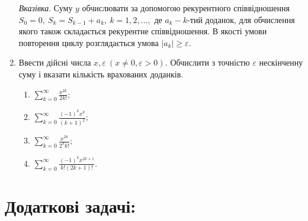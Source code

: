 \documentclass[a5paper,titlepage,openany,twoside,draft]{book_unv}%
\makeatletter
\newcommand{\xslalph}[1]{\expandafter\@xslalph\csname c@#1\endcsname}
\newcommand{\@xslalph}[1]{%
    \ifcase#1\or а\or б\or в\or г\or д\or e\or є\or ж\or з\or i%
    \or й\or к\or л\or м\or н\or о\or п\or р\or с\or т%
    \or у\or ф\or х\or ц\or ч\or ш\or ю\or я\or аа\or бб\or вв%
    \else\@ctrerr\fi%
}
\makeatother
\begin{document}
\begin{enumerate}
\begin{enumerate}[label=\xslalph*)]
\end{enumerate}

\emph{\emph{Вказівка}}. Суму $y$ обчислювати за допомогою
рекурентного співвідношення
\(S_{0} = 0,\ S_{k} = S_{k - 1} + a_{k},\ k = 1,2,\ldots,\) де
\(a_{k} - k\)-тий доданок, для обчислення якого також складається
рекурентне співвідношення. В якості умови повторення циклу розглядається
умова \(\left| a_{k} \right| \geq \varepsilon.\)

\item
  Ввести дійсні числа
  \(x,\varepsilon\ (x \neq 0,\varepsilon > 0)\)\emph{.} Обчислити з
  точністю \(\varepsilon\) нескінченну суму і вказати кількість
  врахованих доданків.
\begin{enumerate}[label=\xslalph*)]
\item \(\sum\limits_{k = 0}^{\infty}\frac{x^{2k}}{2k!};\) 
\item \(\sum\limits_{k = 0}^{\infty}\frac{(-1)^{k}x^{k}}{(k + 1)^{2}};\)
\item \(\sum\limits_{k = 0}^{\infty}\frac{x^{2k}}{2^{k}k!};\) 
\item \(\sum\limits_{k = 0}^{\infty}\frac{(-1)^{k}x^{2k + 1}}{k!(2k + 1)!}.\)
\end{enumerate}

\end{enumerate}

\section{Додаткові задачі:}
\end{document}
